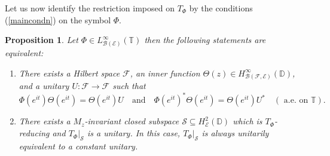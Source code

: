 \documentclass[12pt]{amsart}
\numberwithin{equation}{section}
\newtheorem{propn}{Proposition}[section]
\theoremstyle{definition}
\newcommand{\D}{\mathbb{D}}
\newcommand{\T}{\mathbb{T}}
\newcommand{\1}{{\mbox{\bf 1}}}
\newcommand{\clb}{\mathcal{B}}
\newcommand{\cle}{\mathcal{E}}
\newcommand{\clf}{\mathcal{F}}
\newcommand{\cls}{\mathcal{S}}
\newcommand{\raro}{\rightarrow}
\begin{document}
Let us now identify the restriction imposed on $T_{\Phi}$ by the conditions (\ref{maincondn}) on the symbol $\Phi$.
\begin{propn}\label{mainprop}
Let $\Phi \in L_{\clb(\cle)}^{\infty}(\T)$ then the following statements are equivalent:
\begin{enumerate}
\item[(i)] There exists a Hilbert space $\clf$, an inner function $\Theta(z) \in H_{\clb(\clf,\cle)}^{\infty}(\D)$, and a unitary $U: \clf \raro \clf$ such that
\[
\Phi(e^{it}) \Theta(e^{it}) = \Theta(e^{it}) U \quad \text{and} \quad  \Phi(e^{it})^* \Theta(e^{it}) = \Theta(e^{it}) U^* \quad (\text{ a.e. on } \T).
\]
\item[(ii)] There exists a $M_z$-invariant closed subspace $\cls \subseteq H_{\cle}^2(\D)$ which is $T_{\Phi}$-reducing and $T_{\Phi}|_{ \cls}$ is a unitary.  In this case, $T_{\Phi}|_{\cls}$ is always unitarily equivalent to a constant unitary.
\end{enumerate}
\end{propn}
\end{document}

